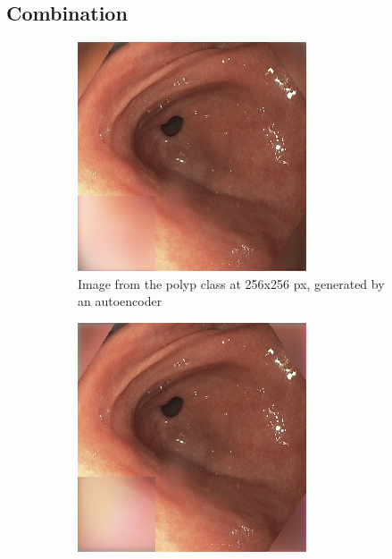     \subsection{Combination}
        \begin{figure}[t]
        \centering
        \begin{subfigure}[b]{0.4\textwidth}
            \centering
            \includegraphics[width=\textwidth]{experiments/figures/both/NPAE.jpg}
            \caption[Is this in use]%
            {{\small Image from the polyp class at 256x256 px, generated by an autoencoder }}    
            \label{fig:polypAEGREEN}
        \end{subfigure}
        \qquad
        \begin{subfigure}[b]{0.4\textwidth}  
            \centering 
            \includegraphics[width=\textwidth]{experiments/figures/both/NPGAN.jpg}

\end{subfigure}
\end{figure}

